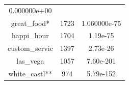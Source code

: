 \documentclass[12pt,twoside]{dukestatscithesis}
\theoremstyle{definition}
\theoremstyle{definition}
\theoremstyle{definition}
\theoremstyle{remark}
\begin{document}
\begin{longtable}[]{@{}ccc@{}}
\begin{minipage}[t]{0.17\columnwidth}
0.000000e+00\strut
\end{minipage}\tabularnewline
\begin{minipage}[t]{0.31\columnwidth}\centering\strut
great\_food*\strut
\end{minipage} & \begin{minipage}[t]{0.44\columnwidth}\centering\strut
1723\strut
\end{minipage} & \begin{minipage}[t]{0.17\columnwidth}\centering\strut
1.060000e-75\strut
\end{minipage}\tabularnewline
\begin{minipage}[t]{0.31\columnwidth}\centering\strut
happi\_hour\strut
\end{minipage} & \begin{minipage}[t]{0.44\columnwidth}\centering\strut
1704\strut
\end{minipage} & \begin{minipage}[t]{0.17\columnwidth}\centering\strut
1.19e-75\strut
\end{minipage}\tabularnewline
\begin{minipage}[t]{0.31\columnwidth}\centering\strut
custom\_servic\strut
\end{minipage} & \begin{minipage}[t]{0.44\columnwidth}\centering\strut
1397\strut
\end{minipage} & \begin{minipage}[t]{0.17\columnwidth}\centering\strut
2.73e-26\strut
\end{minipage}\tabularnewline
\begin{minipage}[t]{0.31\columnwidth}\centering\strut
las\_vega\strut
\end{minipage} & \begin{minipage}[t]{0.44\columnwidth}\centering\strut
1057\strut
\end{minipage} & \begin{minipage}[t]{0.17\columnwidth}\centering\strut
7.60e-201\strut
\end{minipage}\tabularnewline
\begin{minipage}[t]{0.31\columnwidth}\centering\strut
white\_castl**\strut
\end{minipage} & \begin{minipage}[t]{0.44\columnwidth}\centering\strut
974\strut
\end{minipage} & \begin{minipage}[t]{0.17\columnwidth}\centering\strut
5.79e-152\strut
\end{minipage}\tabularnewline

\end{longtable}
\end{document}
